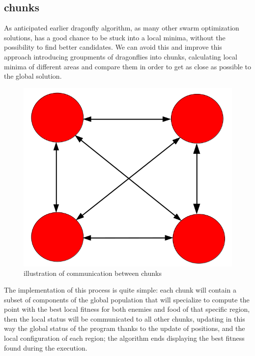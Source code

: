 \documentclass[10pt]{article}
\begin{document}
\begin{multicols}{2}
\subsection*{chunks}

As anticipated earlier dragonfly algorithm, as many other swarm optimization solutions,
has a good chance to be stuck into a local minima, without the possibility to find better
candidates. We can avoid this and improve this approach introducing groupments of dragonflies into chunks, 
calculating local minima of different areas and compare them in order
to get as close as possible to the global solution.  

\begin{figure}[H]
  \includegraphics[scale=0.3]{img/chunks.png}
  \centering
  \caption{illustration of communication between chunks}
\end{figure}

\noindent The implementation of this process is quite simple: each chunk will contain a subset
of components of the global population that will specialize to compute the point with the best local
fitness for both enemies and food of that specific region, then the local status will be communicated
to all other chunks, updating in this way the global status of the program thanks to the update of positions,
and the local configuration of each region; the algorithm ends displaying the best fitness found
during the execution.



\end{multicols}
\end{document}
